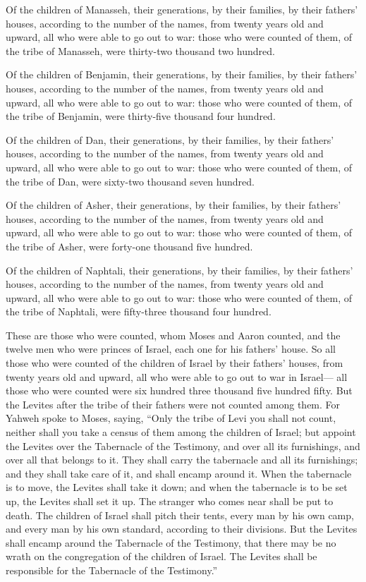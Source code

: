  Of the children of Manasseh, their generations, by their
families, by their fathers' houses, according to the number of the
names, from twenty years old and upward, all who were able to go out to
war:  those who were counted of them, of the tribe of
Manasseh, were thirty-two thousand two hundred.

 Of the children of Benjamin, their generations, by their
families, by their fathers' houses, according to the number of the
names, from twenty years old and upward, all who were able to go out to
war:  those who were counted of them, of the tribe of
Benjamin, were thirty-five thousand four hundred.

 Of the children of Dan, their generations, by their
families, by their fathers' houses, according to the number of the
names, from twenty years old and upward, all who were able to go out to
war:  those who were counted of them, of the tribe of Dan,
were sixty-two thousand seven hundred.

 Of the children of Asher, their generations, by their
families, by their fathers' houses, according to the number of the
names, from twenty years old and upward, all who were able to go out to
war:  those who were counted of them, of the tribe of
Asher, were forty-one thousand five hundred.

 Of the children of Naphtali, their generations, by their
families, by their fathers' houses, according to the number of the
names, from twenty years old and upward, all who were able to go out to
war:  those who were counted of them, of the tribe of
Naphtali, were fifty-three thousand four hundred.

 These are those who were counted, whom Moses and Aaron
counted, and the twelve men who were princes of Israel, each one for his
fathers' house.  So all those who were counted of the
children of Israel by their fathers' houses, from twenty years old and
upward, all who were able to go out to war in Israel--- 
all those who were counted were six hundred three thousand five hundred
fifty.  But the Levites after the tribe of their fathers
were not counted among them.  For Yahweh spoke to Moses,
saying,  ``Only the tribe of Levi you shall not count,
neither shall you take a census of them among the children of Israel;
 but appoint the Levites over the Tabernacle of the
Testimony, and over all its furnishings, and over all that belongs to
it. They shall carry the tabernacle and all its furnishings; and they
shall take care of it, and shall encamp around it.  When
the tabernacle is to move, the Levites shall take it down; and when the
tabernacle is to be set up, the Levites shall set it up. The stranger
who comes near shall be put to death.  The children of
Israel shall pitch their tents, every man by his own camp, and every man
by his own standard, according to their divisions.  But the
Levites shall encamp around the Tabernacle of the Testimony, that there
may be no wrath on the congregation of the children of Israel. The
Levites shall be responsible for the Tabernacle of the Testimony.''

